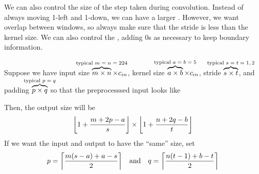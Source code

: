 \documentclass[class=cs480,notes,tikz]{agony}
\begin{document}
We can also control the size of the step taken during convolution.
Instead of always moving 1-left and 1-down, we can have a larger .
However, we want overlap between windows,
so always make sure that the stride is less than the kernel size.
We can also control the ,
adding 0s as necessary to keep boundary information.

Suppose we have input size
$\overbrace{m \times n}^{\mathclap{\text{typical $m=n=224$}}} \times c_{in}$,
kernel size $\overbrace{a \times b}^{\mathclap{\text{typical $a=b=5$}}} \times c_{in}$,
stride $\overbrace{s \times t}^{\mathclap{\text{typical $s=t=1,2$}}}$,
and padding $\overbrace{p \times q}^{\mathclap{\text{typical $p=q$}}}$
so that the preprocesssed input looks like
\begin{center}
\end{center}
Then, the output size will be
\[ \floor*{1+\frac{m+2p-a}{s}} \times \floor*{1+\frac{n+2q-b}{t}} \]
If we want the input and output to have the ``same'' size, set
\[ p = \ceil*{\frac{m(s-a)+a-s}{2}} \qq{and} q = \ceil*{\frac{n(t-1)+b-t}{2}} \]

\end{document}
